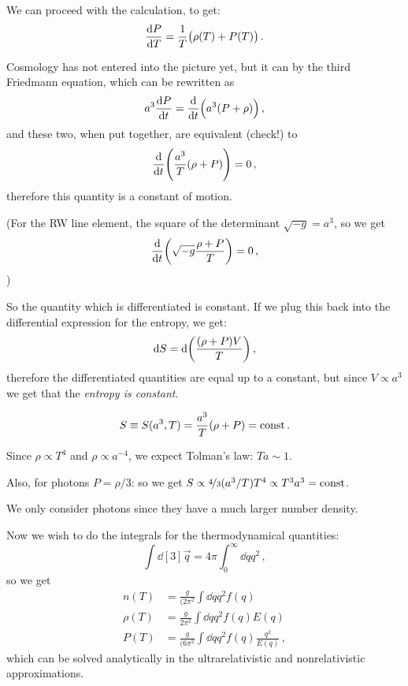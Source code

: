\documentclass[main.tex]{subfiles}
\begin{document}
We can proceed with the calculation, to get: 
%
\begin{equation}
  \dv{P}{T} = \frac{1}{T} \qty(\rho (T ) + P(T))
\,.
\end{equation}
%

Cosmology has not entered into the picture yet, but it can by the third Friedmann equation, which can be rewritten as 
%
\begin{equation}
  a^3 \dv{P}{t} =\dv{}{t} \qty(a^3 (P + \rho ))
\,,
\end{equation}
%
and these two, when put together, are equivalent (check!) to 
%
\begin{equation}
  \dv{}{t} \qty(\frac{a^3}{T} (\rho + P ))=0
\,,
\end{equation}
%
therefore this quantity is a constant of motion. 


(For the RW line element, the square of the determinant \(\sqrt{-g} =  a^3 \), so we get 
%
\begin{equation}
  \dv{}{t} \qty(\sqrt{-g }  \frac{\rho + P}{T}) = 0
\,,
\end{equation}
)

So the quantity which is differentiated is constant. If we plug this back into the differential expression for the entropy, we get: 
%
\begin{equation}
  \dd{S} = \dd \qty(\frac{(\rho + P) V}{T})
\,,
\end{equation}
%
therefore the differentiated quantities are equal up to a constant, but since \(V \propto a^3\) we get that the \emph{entropy is constant}.

\begin{equation}
  S \equiv S(a^3, T) 
  = \frac{a^3}{T} \qty(\rho + P)
  = \const
\,.
\end{equation}

Since \(\rho \propto T^{4}\) and \(\rho \propto a^{-4}\), we expect Tolman's law: \(Ta \sim 1\).

Also, for photons \(P  = \rho / 3\): so we get \(S \propto \frac[i]{4}{3} (a^3/T) T^{4} \propto T^3 a^3 = \const\).

We only consider photons since they have a much larger number density.


Now we wish to do the integrals for the thermodynamical quantities: 
%
\begin{equation}
  \int  \dd[3]{\vec{q}} = 4 \pi \int_0^{\infty}  \dd{q} q^2 
\,,
\end{equation}
%
so we get 
%
\begin{subequations}
\begin{align}
  n(T) &= \frac{g}{(2\pi^2} \int  \dd{q} q^2 f(q) \\ 
  \rho (T) &= \frac{g}{2\pi^2} \int  \dd{q} q^2 f(q) E(q) \\ 
  P (T) &= \frac{g}{(6\pi^2} \int  \dd{q} q^2 f(q) \frac{q^2}{E(q)} 
\,,
\end{align}
\end{subequations}
%
which can be solved analytically in the ultrarelativistic and nonrelativistic approximations.
\end{document}
